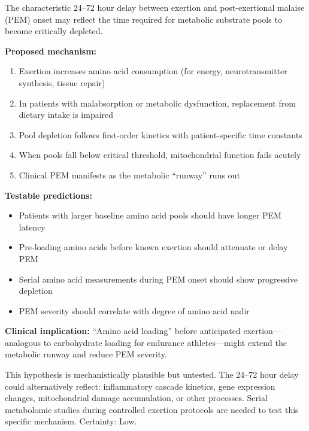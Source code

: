 \begin{hypothesis}
\label{hyp:metabolic-runway}
The characteristic 24--72 hour delay between exertion and post-exertional malaise (PEM) onset may reflect the time required for metabolic substrate pools to become critically depleted.

\textbf{Proposed mechanism:}
\begin{enumerate}
    \item Exertion increases amino acid consumption (for energy, neurotransmitter synthesis, tissue repair)
    \item In patients with malabsorption or metabolic dysfunction, replacement from dietary intake is impaired
    \item Pool depletion follows first-order kinetics with patient-specific time constants
    \item When pools fall below critical threshold, mitochondrial function fails acutely
    \item Clinical PEM manifests as the metabolic ``runway'' runs out
\end{enumerate}

\textbf{Testable predictions:}
\begin{itemize}
    \item Patients with larger baseline amino acid pools should have longer PEM latency
    \item Pre-loading amino acids before known exertion should attenuate or delay PEM
    \item Serial amino acid measurements during PEM onset should show progressive depletion
    \item PEM severity should correlate with degree of amino acid nadir
\end{itemize}

\textbf{Clinical implication:} ``Amino acid loading'' before anticipated exertion---analogous to carbohydrate loading for endurance athletes---might extend the metabolic runway and reduce PEM severity.
\end{hypothesis}

\begin{warning}
This hypothesis is mechanistically plausible but untested. The 24--72 hour delay could alternatively reflect: inflammatory cascade kinetics, gene expression changes, mitochondrial damage accumulation, or other processes. Serial metabolomic studies during controlled exertion protocols are needed to test this specific mechanism. Certainty: Low.
\end{warning}

